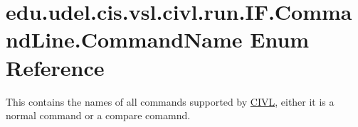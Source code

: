 \hypertarget{enumedu_1_1udel_1_1cis_1_1vsl_1_1civl_1_1run_1_1IF_1_1CommandLine_1_1CommandName}{}\section{edu.\+udel.\+cis.\+vsl.\+civl.\+run.\+I\+F.\+Command\+Line.\+Command\+Name Enum Reference}
\label{enumedu_1_1udel_1_1cis_1_1vsl_1_1civl_1_1run_1_1IF_1_1CommandLine_1_1CommandName}


This contains the names of all commands supported by \hyperlink{classedu_1_1udel_1_1cis_1_1vsl_1_1civl_1_1CIVL}{C\+I\+V\+L}, either it is a normal command or a compare comamnd.  


